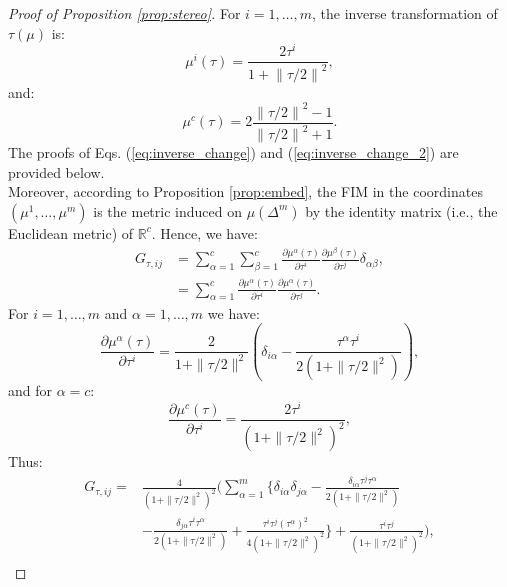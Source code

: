 \documentclass[entropy,article,submit,pdftex,moreauthors]{Definitions/mdpi}
\newcommand{\R}{\ensuremath{\mathbb{R}}}
\theoremstyle{plain}
\theoremstyle{definition}
\begin{document}
\begin{proof}[Proof of Proposition \ref{prop:stereo}]
    For $i=1, \dots, m$, the inverse transformation of $\tau(\mu)$ is:
    \begin{equation}
        \label{eq:inverse_change}
        \mu^i(\tau) = \frac{2\tau^i}{1+\left\|\tau/2\right\|^2},
    \end{equation}
    and:
    \begin{equation}
        \label{eq:inverse_change_2}
        \mu^c(\tau) = 2 \frac{\left\|\tau/2\right\|^2-1}{\left\|\tau/2\right\|^2+1}.
    \end{equation}
    The proofs of Eqs. (\ref{eq:inverse_change}) and (\ref{eq:inverse_change_2}) are provided below. \\
    Moreover, according to Proposition \ref{prop:embed}, the FIM in the coordinates $(\mu^1, \dots, \mu^m)$ is the metric induced on $\mu(\Delta^m)$ by the identity matrix (i.e., the Euclidean metric) of $\R^c$. Hence, we have:
    \begin{align*}
        G_{\tau, ij} &= \sum_{\alpha=1}^c \sum_{\beta=1}^c \frac{\partial \mu^\alpha(\tau)}{\partial \tau^i} \frac{\partial \mu^\beta(\tau)}{\partial \tau^j} \delta_{\alpha \beta}, \\
        &= \sum_{\alpha=1}^c \frac{\partial \mu^\alpha(\tau)}{\partial \tau^i} \frac{\partial \mu^\alpha(\tau)}{\partial \tau^j}.
    \end{align*}
    For $i=1, \dots, m$ and $\alpha=1, \dots, m$ we have:
    \begin{equation*}
        \frac{\partial \mu^\alpha(\tau)}{\partial \tau^i} = \frac{2}{1+\|\tau/2\|^2}\left(\delta_{i \alpha} - \frac{\tau^\alpha \tau^i}{2\left(1+\|\tau/2\|^2\right)} \right),
    \end{equation*}
    and for $\alpha = c$:
    \begin{equation*}
        \frac{\partial \mu^c(\tau)}{\partial \tau^i} = \frac{2\tau^i}{\left(1+\|\tau/2\|^2\right)^2},
    \end{equation*}
    Thus:
    \footnotesize
    \begin{align*}
        G_{\tau, ij} =& \frac{4}{\left(1+\|\tau/2\|^2\right)^2} \Biggl( \sum_{\alpha=1}^m \Biggl\{ \delta_{i \alpha} \delta_{j \alpha} - \frac{\delta_{i \alpha} \tau^j \tau^\alpha}{2\left(1+\|\tau/2\|^2\right)} \\
        &- \frac{\delta_{j \alpha} \tau^i \tau^\alpha}{2\left(1+\|\tau/2\|^2\right)} + \frac{\tau^i \tau^j \left(\tau^\alpha\right)^2}{4\left(1 + \|\tau/2\|^2\right)^2}\Biggl\} + \frac{\tau^i \tau^j}{\left(1 + \|\tau/2\|^2\right)^2} \Biggl), \\

\end{align*}
\end{proof}
\end{document}
